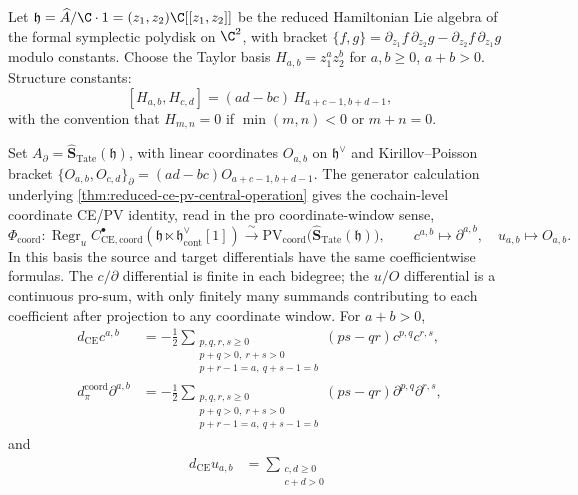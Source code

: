 \documentclass[11pt]{memoir}
\begin{document}
\begin{cor}\label{cor:ce-pv-formal-disk}
  Let $\mathfrak h=\widehat A/\C\cdot 1=(z_1,z_2)\C[[z_1,z_2]]$ be the
  reduced Hamiltonian Lie algebra of the formal symplectic polydisk on
  $\C^2$, with bracket
  $\{f,g\}=\partial_{z_1}f\,\partial_{z_2}g-\partial_{z_2}f\,\partial_{z_1}g$
  modulo constants. Choose the Taylor basis $H_{a,b}=z_1^az_2^b$ for
  $a,b\geq 0$, $a+b>0$. Structure constants:
  $$[H_{a,b},H_{c,d}]=(ad-bc)\,H_{a+c-1,b+d-1},$$
  with the convention that $H_{m,n}=0$ if $\min(m,n)<0$ or $m+n=0$.

  Set $A_\partial=\widehat{\mathbf S}_{\mathrm{Tate}}(\mathfrak h)$,
  with linear coordinates $O_{a,b}$ on $\mathfrak h^\vee$ and
  Kirillov--Poisson bracket
  $\{O_{a,b},O_{c,d}\}_\partial=(ad-bc)O_{a+c-1,b+d-1}$.
  The generator calculation underlying
	  \ref{thm:reduced-ce-pv-central-operation} gives the cochain-level
		  coordinate CE/PV identity, read in the pro coordinate-window sense,
			  $$\Phi_{\mathrm{coord}}:\operatorname{Regr}_u
          C^\bullet_{\mathrm{CE},\mathrm{coord}}(\mathfrak h\ltimes
		    \mathfrak h^\vee_{\mathrm{cont}}[1])\xrightarrow{\ \sim\ }
	    \mathrm{PV}_{\mathrm{coord}}
	    \bigl(\widehat{\mathbf S}_{\mathrm{Tate}}(\mathfrak h)\bigr),
		    \qquad c^{a,b}\mapsto\partial^{a,b},\quad
        u_{a,b}\mapsto O_{a,b}.$$
  In this basis the source and target differentials have the same
  coefficientwise formulas.  The \(c/\partial\) differential is finite in
  each bidegree; the \(u/O\) differential is a continuous pro-sum, with
  only finitely many summands contributing to each coefficient after
  projection to any coordinate window.  For \(a+b>0\),
  \[
  \begin{aligned}
    d_{\mathrm{CE}}c^{a,b}
      &=
      -\frac12
      \sum_{\substack{p,q,r,s\ge0\\p+q>0,\ r+s>0\\
      p+r-1=a,\ q+s-1=b}}
      (ps-qr)c^{p,q}c^{r,s},\\
    d_{\pi}^{\mathrm{coord}}\partial^{a,b}
      &=
      -\frac12
      \sum_{\substack{p,q,r,s\ge0\\p+q>0,\ r+s>0\\
      p+r-1=a,\ q+s-1=b}}
      (ps-qr)\partial^{p,q}\partial^{r,s},
  \end{aligned}
  \]
  and
  \[
  \begin{aligned}
    d_{\mathrm{CE}}u_{a,b}
      &=
      \sum_{\substack{c,d\ge0\\c+d>0\\
}}
\end{aligned}\]
\end{cor}
\end{document}
